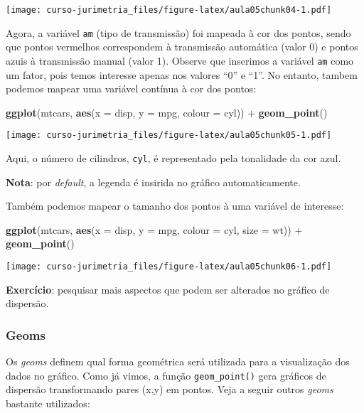 \documentclass[]{book}
\newenvironment{Shaded}{\begin{snugshade}}{\end{snugshade}}
\newcommand{\KeywordTok}[1]{\textcolor[rgb]{0.13,0.29,0.53}{\textbf{{#1}}}}
\newcommand{\DataTypeTok}[1]{\textcolor[rgb]{0.13,0.29,0.53}{{#1}}}
\newcommand{\StringTok}[1]{\textcolor[rgb]{0.31,0.60,0.02}{{#1}}}
\newcommand{\NormalTok}[1]{{#1}}
\begin{document}
\texttt{[image: curso-jurimetria\_files/figure-latex/aula05chunk04-1.pdf]}

Agora, a variável \texttt{am} (tipo de transmissão) foi mapeada à cor
dos pontos, sendo que pontos vermelhos correspondem à transmissão
automática (valor 0) e pontos azuis à transmissão manual (valor 1).
Observe que inserimos a variável \texttt{am} como um fator, pois temos
interesse apenas nos valores ``0'' e ``1''. No entanto, tambem podemos
mapear uma variável contínua à cor dos pontos:

\begin{Shaded}
\begin{Highlighting}[]
\KeywordTok{ggplot}\NormalTok{(mtcars, }\KeywordTok{aes}\NormalTok{(}\DataTypeTok{x =} \NormalTok{disp, }\DataTypeTok{y =} \NormalTok{mpg, }\DataTypeTok{colour =} \NormalTok{cyl)) +}\StringTok{ }
\StringTok{  }\KeywordTok{geom_point}\NormalTok{()}
\end{Highlighting}
\end{Shaded}

\texttt{[image: curso-jurimetria\_files/figure-latex/aula05chunk05-1.pdf]}

Aqui, o número de cilindros, \texttt{cyl}, é representado pela
tonalidade da cor azul.

\textbf{Nota}: por \emph{default}, a legenda é insirida no gráfico
automaticamente.

Também podemos mapear o tamanho dos pontos à uma variável de interesse:

\begin{Shaded}
\begin{Highlighting}[]
\KeywordTok{ggplot}\NormalTok{(mtcars, }\KeywordTok{aes}\NormalTok{(}\DataTypeTok{x =} \NormalTok{disp, }\DataTypeTok{y =} \NormalTok{mpg, }\DataTypeTok{colour =} \NormalTok{cyl, }\DataTypeTok{size =} \NormalTok{wt)) +}
\StringTok{  }\KeywordTok{geom_point}\NormalTok{()}
\end{Highlighting}
\end{Shaded}

\texttt{[image: curso-jurimetria\_files/figure-latex/aula05chunk06-1.pdf]}

\textbf{Exercício}: pesquisar mais aspectos que podem ser alterados no
gráfico de dispersão.

\subsubsection{Geoms}\label{geoms}

Os \emph{geoms} definem qual forma geométrica será utilizada para a
visualização dos dados no gráfico. Como já vimos, a função
\texttt{geom\_point()} gera gráficos de dispersão transformando pares
(x,y) em pontos. Veja a seguir outros \emph{geoms} bastante utilizados:
\end{document}
